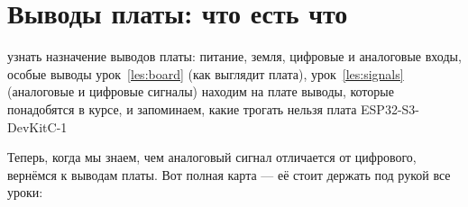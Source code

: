 \section{Выводы платы: что есть что}
\label{les:pins}
\lessonintro
  {узнать назначение выводов платы: питание, земля, цифровые и аналоговые входы, особые выводы}
  {урок~\ref{les:board} (как выглядит плата), урок~\ref{les:signals} (аналоговые и цифровые сигналы)}
  {находим на плате выводы, которые понадобятся в курсе, и запоминаем, какие трогать нельзя}
  {плата ESP32-S3-DevKitC-1}

Теперь, когда мы знаем, чем аналоговый сигнал отличается от цифрового, вернёмся к выводам
платы. Вот полная карта --- её стоит держать под рукой все уроки:

